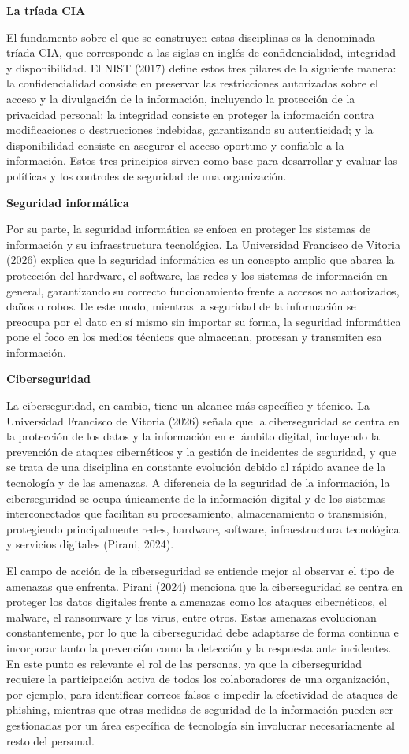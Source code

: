 \documentclass[12pt,letterpaper]{article}
\newcommand{\subtitulo}[1]{\vspace{12pt}\noindent\textbf{#1}\par\vspace{10pt}}
\begin{document}
\subtitulo{La tríada CIA}
El fundamento sobre el que se construyen estas disciplinas es la denominada tríada CIA, que corresponde a las siglas en inglés de confidencialidad, integridad y disponibilidad. El NIST (2017) define estos tres pilares de la siguiente manera: la confidencialidad consiste en preservar las restricciones autorizadas sobre el acceso y la divulgación de la información, incluyendo la protección de la privacidad personal; la integridad consiste en proteger la información contra modificaciones o destrucciones indebidas, garantizando su autenticidad; y la disponibilidad consiste en asegurar el acceso oportuno y confiable a la información. Estos tres principios sirven como base para desarrollar y evaluar las políticas y los controles de seguridad de una organización.

\subtitulo{Seguridad informática}
Por su parte, la seguridad informática se enfoca en proteger los sistemas de información y su infraestructura tecnológica. La Universidad Francisco de Vitoria (2026) explica que la seguridad informática es un concepto amplio que abarca la protección del hardware, el software, las redes y los sistemas de información en general, garantizando su correcto funcionamiento frente a accesos no autorizados, daños o robos. De este modo, mientras la seguridad de la información se preocupa por el dato en sí mismo sin importar su forma, la seguridad informática pone el foco en los medios técnicos que almacenan, procesan y transmiten esa información.

\subtitulo{Ciberseguridad}
La ciberseguridad, en cambio, tiene un alcance más específico y técnico. La Universidad Francisco de Vitoria (2026) señala que la ciberseguridad se centra en la protección de los datos y la información en el ámbito digital, incluyendo la prevención de ataques cibernéticos y la gestión de incidentes de seguridad, y que se trata de una disciplina en constante evolución debido al rápido avance de la tecnología y de las amenazas. A diferencia de la seguridad de la información, la ciberseguridad se ocupa únicamente de la información digital y de los sistemas interconectados que facilitan su procesamiento, almacenamiento o transmisión, protegiendo principalmente redes, hardware, software, infraestructura tecnológica y servicios digitales (Pirani, 2024).

El campo de acción de la ciberseguridad se entiende mejor al observar el tipo de amenazas que enfrenta. Pirani (2024) menciona que la ciberseguridad se centra en proteger los datos digitales frente a amenazas como los ataques cibernéticos, el malware, el ransomware y los virus, entre otros. Estas amenazas evolucionan constantemente, por lo que la ciberseguridad debe adaptarse de forma continua e incorporar tanto la prevención como la detección y la respuesta ante incidentes. En este punto es relevante el rol de las personas, ya que la ciberseguridad requiere la participación activa de todos los colaboradores de una organización, por ejemplo, para identificar correos falsos e impedir la efectividad de ataques de phishing, mientras que otras medidas de seguridad de la información pueden ser gestionadas por un área específica de tecnología sin involucrar necesariamente al resto del personal.
\end{document}
